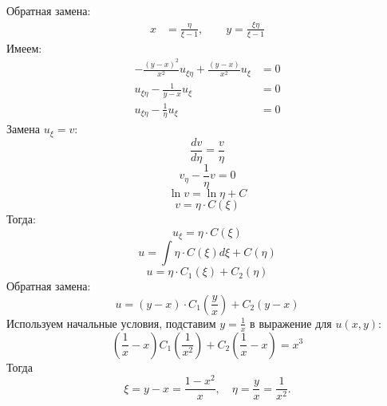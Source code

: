 \documentclass[a4paper,12pt]{article}
\begin{document}
        Обратная замена:
        \begin{align*}
            x &= \frac{\eta}{\xi - 1}, \quad \quad y = \frac{\xi\eta}{\xi - 1}
        \end{align*}
        Имеем:
        \begin{align*}
            -\frac{(y-x)^2}{x^2}u_{\xi\eta} + \frac{(y-x)}{x^2}u_{\xi} &= 0 \\
            u_{\xi\eta} - \frac{1}{y - x}u_{\xi} &= 0 \\
            u_{\xi\eta} - \frac{1}{\eta}u_{\xi} &= 0
        \end{align*}
        Замена $u_{\xi}=v$:
        \begin{equation*}
            \frac{dv}{d\eta} =\frac{v}{\eta}
        \end{equation*}
        \begin{equation*}
            v_{\eta} - \frac{1}{\eta}v = 0
        \end{equation*}
        \begin{equation*}
        \ln v =\ln \eta + C
        \end{equation*}
        \begin{equation*}
        v =\eta \cdot C(\xi)
        \end{equation*}
        Тогда:
        \begin{equation*}
            u_{\xi} = \eta \cdot C(\xi)
        \end{equation*}
        \begin{equation*}
            u = \int \eta \cdot C(\xi) d\xi + C(\eta)
        \end{equation*}
        \begin{equation*}
            u = \eta \cdot C_1(\xi)+ C_2(\eta)
        \end{equation*}
        Обратная замена:
        \begin{equation*}
            u = (y-x) \cdot C_1(\frac{y}{x})+ C_2(y-x)
        \end{equation*}
        Используем начальные условия, подставим $ y = \frac{1}{x} $ в выражение для $ u(x,y) $:
        \begin{equation*}
            \left( \frac{1}{x} - x \right) C_1 \left( \frac{1}{x^2} \right) + C_2 \left( \frac{1}{x} - x \right) =x^3
        \end{equation*}
        Тогда
        \begin{equation*}
            \xi = y - x = \frac{1 - x^2}{x}, \quad \eta = \frac{y}{x} = \frac{1}{x^2}.
        \end{equation*}
\end{document}
